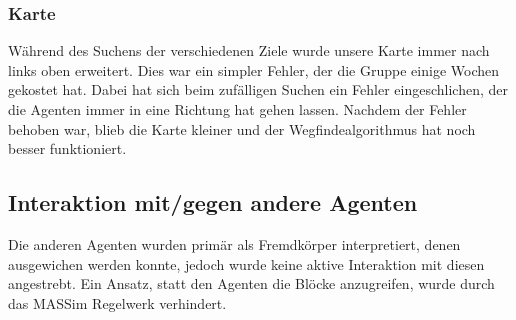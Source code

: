 \subsubsection{Karte}
Während des Suchens der verschiedenen Ziele wurde unsere Karte immer nach links oben erweitert. Dies war ein simpler Fehler, der die Gruppe einige Wochen gekostet hat. Dabei hat sich beim zufälligen Suchen ein Fehler eingeschlichen, der die Agenten immer in eine Richtung hat gehen lassen. Nachdem der Fehler behoben war, blieb die Karte kleiner und der Wegfindealgorithmus hat noch besser funktioniert.


\subsection{Interaktion mit/gegen andere Agenten}
Die anderen Agenten wurden primär als Fremdkörper interpretiert, denen ausgewichen werden konnte, jedoch wurde keine aktive Interaktion mit diesen angestrebt. Ein Ansatz, statt den Agenten die Blöcke anzugreifen, wurde durch das MASSim Regelwerk verhindert. 